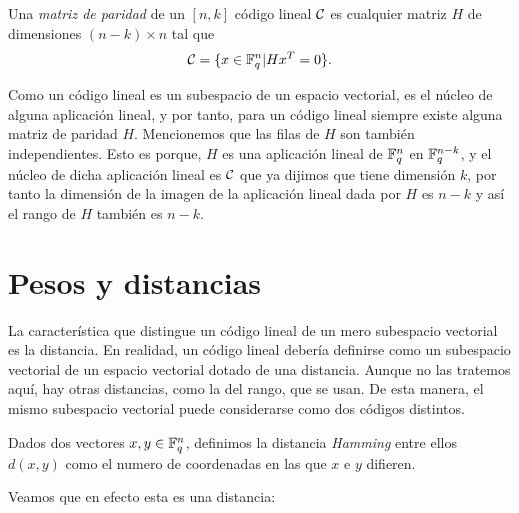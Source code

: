 \begin{definition}
    Una \textit{matriz de paridad } de un \([n,k]\) código lineal \(\mathcal{C}\) es cualquier matriz \(H\) de dimensiones \((n-k)\times n\) tal que
    \[
    \mathcal{C} = \{x \in \mathbb{F}_q^n | Hx^T = 0\}
    .\]
\end{definition}

Como un código lineal es un subespacio de un espacio vectorial, es el núcleo de alguna aplicación lineal, y por tanto, para un código lineal siempre existe alguna matriz de paridad \(H\). Mencionemos que las filas de \(H\) son también independientes. Esto es porque, \(H\) es una aplicación lineal de \(\mathbb{F}_q^n\) en  \(\mathbb{F}_q^{n-k}\), y el núcleo de dicha aplicación lineal es \(\mathcal{C}\) que ya dijimos que tiene dimensión \(k\), por tanto la dimensión de la imagen de la aplicación lineal dada por \(H\) es \(n-k\) y así el rango de \(H\) también es \(n-k\).

\section{Pesos y distancias}
La característica que distingue un código lineal de un mero subespacio vectorial es la distancia. En realidad, un código lineal debería definirse como un subespacio vectorial de un espacio vectorial dotado de una distancia. Aunque no las tratemos aquí, hay otras distancias, como la del rango, que se usan. De esta manera, el mismo subespacio vectorial puede considerarse como dos códigos distintos.

\begin{definition}
Dados dos vectores \(x, y \in \mathbb{F}_q^n\), definimos la distancia \textit{Hamming} entre ellos \(d(x,y)\) como el numero de coordenadas en las que  \(x\) e \(y\) difieren.
\end{definition}

Veamos que en efecto esta es una distancia:

